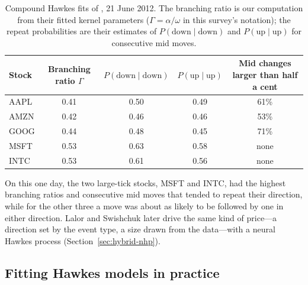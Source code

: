 \begin{table}[!htbp]
\centering\footnotesize
\caption{Compound Hawkes fits of \citet{swishchuk2020gchp}, 21 June 2012. The branching ratio is our computation
from their fitted kernel parameters ($\Gamma = \alpha/\omega$ in this survey's notation); the repeat
probabilities are their estimates of $P(\text{down}\mid\text{down})$ and $P(\text{up}\mid\text{up})$ for
consecutive mid moves.}
\label{tab:chp-fit}
\begin{tabular}{lcccc}
\toprule
Stock & Branching ratio $\Gamma$ & $P(\text{down}\mid\text{down})$ & $P(\text{up}\mid\text{up})$ & Mid changes larger than half a cent \\
\midrule
AAPL & 0.41 & 0.50 & 0.49 & 61\% \\
AMZN & 0.42 & 0.46 & 0.46 & 53\% \\
GOOG & 0.44 & 0.48 & 0.45 & 71\% \\
MSFT & 0.53 & 0.63 & 0.58 & none \\
INTC & 0.53 & 0.61 & 0.56 & none \\
\bottomrule
\end{tabular}
\end{table}

On this one day, the two large-tick stocks, MSFT and INTC, had the highest branching ratios and consecutive mid
moves that tended to repeat their direction, while for the other three a move was about as likely to be
followed by one in either direction. Lalor and Swishchuk later drive the same kind of price---a direction set by
the event type, a size drawn from the data---with a neural Hawkes process (Section~\ref{sec:hybrid-nhp}).

\subsection{Fitting Hawkes models in practice}
\label{sec:hawkes-fit}

